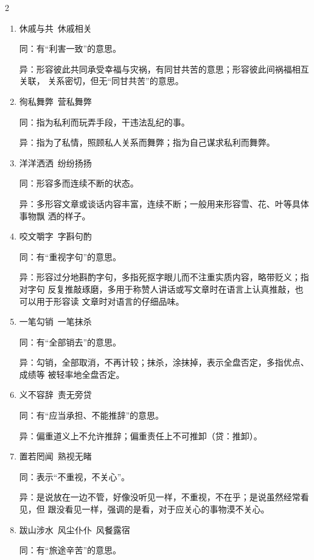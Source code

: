 \documentclass[final,oneside]{ctexbook}
\begin{document}
\begin{multicols}{2}
\begin{enumerate}
      异：表示缺点遮不住优点；表示有优点也有缺点，没有主次之分。

    \item 休戚与共~休戚相关

      同：有“利害一致”的意思。

      异：形容彼此共同承受幸福与灾祸，有同甘共苦的意思；形容彼此间祸福相互关联，
      关系密切，但无“同甘共苦”的意思。

    \item 徇私舞弊~营私舞弊

      同：指为私利而玩弄手段，干违法乱纪的事。

      异：指为了私情，照顾私人关系而舞弊；指为自己谋求私利而舞弊。

    \item 洋洋洒洒~纷纷扬扬

      同：形容多而连续不断的状态。

      异：多形容文章或谈话内容丰富，连续不断；一般用来形容雪、花、叶等具体事物飘
      洒的样子。

    \item 咬文嚼字~字斟句酌

      同：有“重视字句”的意思。

      异：形容过分地斟酌字句，多指死抠字眼儿而不注重实质内容，略带贬义；指对字句
      反复推敲琢磨，多用于称赞人讲话或写文章时在语言上认真推敲，也可以用于形容读
      文章时对语言的仔细品味。

    \item 一笔勾销~一笔抹杀

      同：有“全部销去”的意思。

      异：勾销，全部取消，不再计较；抹杀，涂抹掉，表示全盘否定，多指优点、成绩等
      被轻率地全盘否定。

    \item 义不容辞~责无旁贷

      同：有“应当承担、不能推辞”的意思。

      异：偏重道义上不允许推辞；偏重责任上不可推卸（贷：推卸）。

    \item 置若罔闻~熟视无睹

      同：表示“不重视，不关心”。

      异：是说放在一边不管，好像没听见一样，不重视，不在乎；是说虽然经常看见，但
      跟没看见一样，强调的是看，对于应关心的事物漠不关心。

    \item 跋山涉水~风尘仆仆~风餐露宿

      同：有“旅途辛苦”的意思。


\end{enumerate}
\end{multicols}
\end{document}
